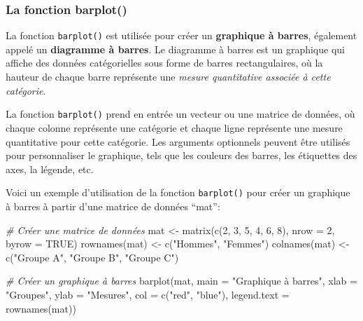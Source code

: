 \documentclass[
]{article}
\newenvironment{Shaded}{\begin{snugshade}}{\end{snugshade}}
\newcommand{\AttributeTok}[1]{\textcolor[rgb]{0.77,0.63,0.00}{#1}}
\newcommand{\CommentTok}[1]{\textcolor[rgb]{0.56,0.35,0.01}{\textit{#1}}}
\newcommand{\ConstantTok}[1]{\textcolor[rgb]{0.00,0.00,0.00}{#1}}
\newcommand{\DecValTok}[1]{\textcolor[rgb]{0.00,0.00,0.81}{#1}}
\newcommand{\FunctionTok}[1]{\textcolor[rgb]{0.00,0.00,0.00}{#1}}
\newcommand{\NormalTok}[1]{#1}
\newcommand{\OtherTok}[1]{\textcolor[rgb]{0.56,0.35,0.01}{#1}}
\newcommand{\StringTok}[1]{\textcolor[rgb]{0.31,0.60,0.02}{#1}}
\begin{document}
\hypertarget{la-fonction-barplot}{%
\subsubsection{La fonction barplot()}\label{la-fonction-barplot}}

La fonction \texttt{barplot()} est utilisée pour créer un \textbf{graphique à barres}, également appelé un \textbf{diagramme à barres}. Le diagramme à barres est un graphique qui affiche des données catégorielles sous forme de barres rectangulaires, où la hauteur de chaque barre représente une \emph{mesure quantitative associée à cette catégorie}.

La fonction \texttt{barplot()} prend en entrée un vecteur ou une matrice de données, où chaque colonne représente une catégorie et chaque ligne représente une mesure quantitative pour cette catégorie. Les arguments optionnels peuvent être utilisés pour personnaliser le graphique, tels que les couleurs des barres, les étiquettes des axes, la légende, etc.

Voici un exemple d'utilisation de la fonction \texttt{barplot()} pour créer un graphique à barres à partir d'une matrice de données ``mat'':

\begin{Shaded}
\begin{Highlighting}[]
\CommentTok{\# Créer une matrice de données}
\NormalTok{mat }\OtherTok{\textless{}{-}} \FunctionTok{matrix}\NormalTok{(}\FunctionTok{c}\NormalTok{(}\DecValTok{2}\NormalTok{, }\DecValTok{3}\NormalTok{, }\DecValTok{5}\NormalTok{, }\DecValTok{4}\NormalTok{, }\DecValTok{6}\NormalTok{, }\DecValTok{8}\NormalTok{), }\AttributeTok{nrow =} \DecValTok{2}\NormalTok{, }\AttributeTok{byrow =} \ConstantTok{TRUE}\NormalTok{)}
\FunctionTok{rownames}\NormalTok{(mat) }\OtherTok{\textless{}{-}} \FunctionTok{c}\NormalTok{(}\StringTok{"Hommes"}\NormalTok{, }\StringTok{"Femmes"}\NormalTok{)}
\FunctionTok{colnames}\NormalTok{(mat) }\OtherTok{\textless{}{-}} \FunctionTok{c}\NormalTok{(}\StringTok{"Groupe A"}\NormalTok{, }\StringTok{"Groupe B"}\NormalTok{, }\StringTok{"Groupe C"}\NormalTok{)}

\CommentTok{\# Créer un graphique à barres}
\FunctionTok{barplot}\NormalTok{(mat, }\AttributeTok{main =} \StringTok{"Graphique à barres"}\NormalTok{, }\AttributeTok{xlab =} \StringTok{"Groupes"}\NormalTok{, }\AttributeTok{ylab =} \StringTok{"Mesures"}\NormalTok{, }
        \AttributeTok{col =} \FunctionTok{c}\NormalTok{(}\StringTok{"red"}\NormalTok{, }\StringTok{"blue"}\NormalTok{), }\AttributeTok{legend.text =} \FunctionTok{rownames}\NormalTok{(mat))}
\end{Highlighting}
\end{Shaded}
\end{document}
